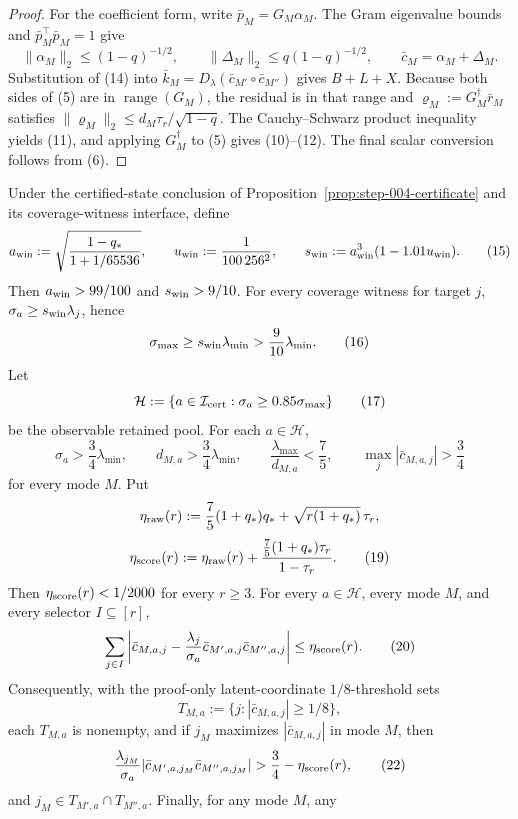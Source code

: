\begin{proposition}
\begin{proof}
For the coefficient form, write $\bar p_M=G_M\alpha_M$.  The Gram
eigenvalue bounds and $\bar p_M^\top\bar p_M=1$ give
\[
\|\alpha_M\|_2\le(1-q)^{-1/2},\qquad
\|\Delta_M\|_2\le q(1-q)^{-1/2},\qquad
\bar c_M=\alpha_M+\Delta_M.
\tag{14}
\]
Substitution of (14) into
$\bar k_M=D_\lambda(\bar c_{M'}\circ\bar c_{M''})$ gives $B+L+X$.
Because both sides of (5) are in $\operatorname{range}(G_M)$, the residual
is in that range and $\varrho_M:=G_M^\dagger\bar r_M$ satisfies
$\|\varrho_M\|_2\le d_M\tau_r/\sqrt{1-q}$.  The Cauchy--Schwarz
product inequality yields (11), and applying $G_M^\dagger$ to (5) gives
(10)--(12).  The final scalar conversion follows from (6). 


\end{proof}
\end{proposition}
\begin{proposition}\label{prop:step-005-threshold-ledger}
Under the certified-state conclusion of Proposition~\ref{prop:step-004-certificate}
and its coverage-witness interface, define
\[
a_{\rm win}:=\sqrt{\frac{1-q_*}{1+1/65536}},\qquad
u_{\rm win}:=\frac1{100\,256^2},\qquad
s_{\rm win}:=a_{\rm win}^3(1-1.01u_{\rm win}).
\tag{15}
\]
Then $a_{\rm win}>99/100$ and $s_{\rm win}>9/10$.  For every coverage
witness for target $j$, $\sigma_a\ge s_{\rm win}\lambda_j$, hence
\[
\sigma_{\max}\ge s_{\rm win}\lambda_{\min}>\frac9{10}\lambda_{\min}.
\tag{16}
\]
Let
\[
\mathcal H:=\{a\in\mathcal I_{\rm cert}:\sigma_a\ge0.85\sigma_{\max}\}
\tag{17}
\]
be the observable retained pool.  For each $a\in\mathcal H$,
\[
\sigma_a>\frac34\lambda_{\min},\qquad
d_{M,a}>\frac34\lambda_{\min},\qquad
\frac{\lambda_{\max}}{d_{M,a}}<\frac75,\qquad
\max_j|\bar c_{M,a,j}|>\frac34
\tag{18}
\]
for every mode $M$.  Put
\[
\eta_{\rm raw}(r):=\frac75(1+q_*)q_*+
\sqrt{r(1+q_*)}\,\tau_r,
\]
\[
\eta_{\rm score}(r):=\eta_{\rm raw}(r)+
\frac{\frac75(1+q_*)\tau_r}{1-\tau_r}.
\tag{19}
\]
Then $\eta_{\rm score}(r)<1/2000$ for every $r\ge3$.  For every
$a\in\mathcal H$, every mode $M$, and every selector $I\subseteq[r]$,
\[
\sum_{j\in I}\left|
\bar c_{M,a,j}-\frac{\lambda_j}{\sigma_a}
\bar c_{M',a,j}\bar c_{M'',a,j}
\right|\le\eta_{\rm score}(r).
\tag{20}
\]
Consequently, with the proof-only latent-coordinate $1/8$-threshold sets
\[
T_{M,a}:=\{j:|\bar c_{M,a,j}|\ge1/8\},
\tag{21}
\]
each $T_{M,a}$ is nonempty, and if $j_M$ maximizes
$|\bar c_{M,a,j}|$ in mode $M$, then
\[
\frac{\lambda_{j_M}}{\sigma_a}
|\bar c_{M',a,j_M}\bar c_{M'',a,j_M}|
>\frac34-\eta_{\rm score}(r),
\tag{22}
\]
and $j_M\in T_{M',a}\cap T_{M'',a}$.  Finally, for any mode $M$, any

\end{proposition}
